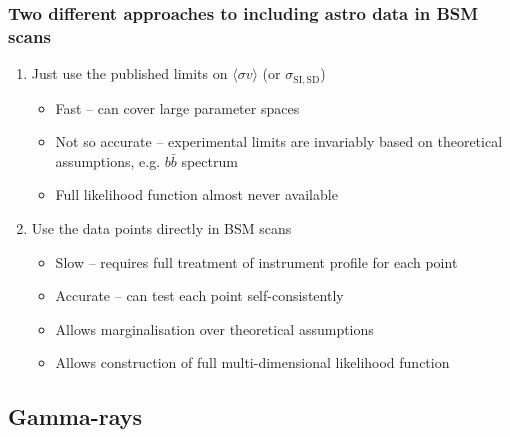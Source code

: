 \documentclass[xcolor=dvipsnames]{beamer}
\begin{document}
\begin{frame}

  \frametitle{Two different approaches to including astro data in BSM scans}



  \begin{enumerate}

  \item{Just use the published limits on $\langle \sigma v\rangle$ (or $\sigma_\mathrm{SI,SD}$)}

    \begin{itemize}

    \item{Fast -- can cover large parameter spaces}

    \item{Not so accurate -- experimental limits are invariably based on theoretical assumptions, e.g. $b\bar b$ spectrum}

    \item{Full likelihood function almost never available}

    \end{itemize}

  \item\alert<2-3>{Use the data points directly in BSM scans} 

    \begin{itemize}

    \item{Slow -- requires full treatment of instrument profile for each point}

    \item{Accurate -- can test each point self-consistently}

    \item{Allows marginalisation over theoretical assumptions}

    \item{Allows construction of full multi-dimensional likelihood function}

    \end{itemize}


  \end{enumerate}

\end{frame}


\subsection{Gamma-rays}
\end{document}
